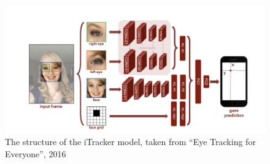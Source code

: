 \documentclass[twocolumn]{report}
\begin{document}



\begin{figure}[h]
    \begin{center}
        \includegraphics[scale=0.3]{../assets/iTracker-network.png}
    \end{center}
    \caption{The structure of the iTracker model, taken from ``Eye Tracking for Everyone'', 2016~\cite{krafka2016eye}}
    \label{fig:itracker-model}
\end{figure}
\end{document}
